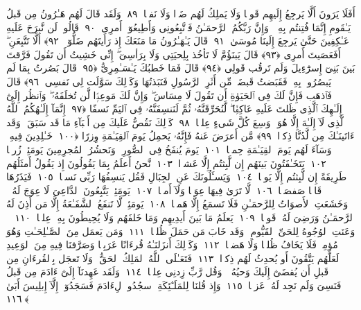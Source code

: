  أَفَلَا يَرَونَ أَلَّا يَرجِعُ إِلَيهِم قَولًۭا وَلَا يَملِكُ لَهُم ضَرًّۭا وَلَا نَفعًۭا ﴿٨٩﴾
 وَلَقَد قَالَ لَهُم هَـٰرُونُ مِن قَبلُ يَـٰقَومِ إِنَّمَا فُتِنتُم بِهِۦ ۖ وَإِنَّ رَبَّكُمُ ٱلرَّحمَـٰنُ فَٱتَّبِعُونِى وَأَطِيعُوٓا۟ أَمرِى ﴿٩٠﴾
 قَالُوا۟ لَن نَّبرَحَ عَلَيهِ عَـٰكِفِينَ حَتَّىٰ يَرجِعَ إِلَينَا مُوسَىٰ ﴿٩١﴾
 قَالَ يَـٰهَـٰرُونُ مَا مَنَعَكَ إِذ رَأَيتَهُم ضَلُّوٓا۟ ﴿٩٢﴾
 أَلَّا تَتَّبِعَنِ ۖ أَفَعَصَيتَ أَمرِى ﴿٩٣﴾
 قَالَ يَبنَؤُمَّ لَا تَأخُذ بِلِحيَتِى وَلَا بِرَأسِىٓ ۖ إِنِّى خَشِيتُ أَن تَقُولَ فَرَّقتَ بَينَ بَنِىٓ إِسرَٰٓءِيلَ وَلَم تَرقُب قَولِى ﴿٩٤﴾
 قَالَ فَمَا خَطبُكَ يَـٰسَـٰمِرِىُّ ﴿٩٥﴾
 قَالَ بَصُرتُ بِمَا لَم يَبصُرُوا۟ بِهِۦ فَقَبَضتُ قَبضَةًۭ مِّن أَثَرِ ٱلرَّسُولِ فَنَبَذتُهَا وَكَذَٟلِكَ سَوَّلَت لِى نَفسِى ﴿٩٦﴾
 قَالَ فَٱذهَب فَإِنَّ لَكَ فِى ٱلحَيَوٰةِ أَن تَقُولَ لَا مِسَاسَ ۖ وَإِنَّ لَكَ مَوعِدًۭا لَّن تُخلَفَهُۥ ۖ وَٱنظُر إِلَىٰٓ إِلَـٰهِكَ ٱلَّذِى ظَلتَ عَلَيهِ عَاكِفًۭا ۖ لَّنُحَرِّقَنَّهُۥ ثُمَّ لَنَنسِفَنَّهُۥ فِى ٱليَمِّ نَسفًا ﴿٩٧﴾
 إِنَّمَآ إِلَـٰهُكُمُ ٱللَّهُ ٱلَّذِى لَآ إِلَـٰهَ إِلَّا هُوَ ۚ وَسِعَ كُلَّ شَىءٍ عِلمًۭا ﴿٩٨﴾
 كَذَٟلِكَ نَقُصُّ عَلَيكَ مِن أَنۢبَآءِ مَا قَد سَبَقَ ۚ وَقَد ءَاتَينَـٰكَ مِن لَّدُنَّا ذِكرًۭا ﴿٩٩﴾
 مَّن أَعرَضَ عَنهُ فَإِنَّهُۥ يَحمِلُ يَومَ ٱلقِيَـٰمَةِ وِزرًا ﴿١٠٠﴾
 خَـٰلِدِينَ فِيهِ ۖ وَسَآءَ لَهُم يَومَ ٱلقِيَـٰمَةِ حِملًۭا ﴿١٠١﴾
 يَومَ يُنفَخُ فِى ٱلصُّورِ ۚ وَنَحشُرُ ٱلمُجرِمِينَ يَومَئِذٍۢ زُرقًۭا ﴿١٠٢﴾
 يَتَخَـٰفَتُونَ بَينَهُم إِن لَّبِثتُم إِلَّا عَشرًۭا ﴿١٠٣﴾
 نَّحنُ أَعلَمُ بِمَا يَقُولُونَ إِذ يَقُولُ أَمثَلُهُم طَرِيقَةً إِن لَّبِثتُم إِلَّا يَومًۭا ﴿١٠٤﴾
 وَيَسـَٔلُونَكَ عَنِ ٱلجِبَالِ فَقُل يَنسِفُهَا رَبِّى نَسفًۭا ﴿١٠٥﴾
 فَيَذَرُهَا قَاعًۭا صَفصَفًۭا ﴿١٠٦﴾
 لَّا تَرَىٰ فِيهَا عِوَجًۭا وَلَآ أَمتًۭا ﴿١٠٧﴾
 يَومَئِذٍۢ يَتَّبِعُونَ ٱلدَّاعِىَ لَا عِوَجَ لَهُۥ ۖ وَخَشَعَتِ ٱلأَصوَاتُ لِلرَّحمَـٰنِ فَلَا تَسمَعُ إِلَّا هَمسًۭا ﴿١٠٨﴾
 يَومَئِذٍۢ لَّا تَنفَعُ ٱلشَّفَـٰعَةُ إِلَّا مَن أَذِنَ لَهُ ٱلرَّحمَـٰنُ وَرَضِىَ لَهُۥ قَولًۭا ﴿١٠٩﴾
 يَعلَمُ مَا بَينَ أَيدِيهِم وَمَا خَلفَهُم وَلَا يُحِيطُونَ بِهِۦ عِلمًۭا ﴿١١٠﴾
 ۞ وَعَنَتِ ٱلوُجُوهُ لِلحَىِّ ٱلقَيُّومِ ۖ وَقَد خَابَ مَن حَمَلَ ظُلمًۭا ﴿١١١﴾
 وَمَن يَعمَل مِنَ ٱلصَّـٰلِحَـٰتِ وَهُوَ مُؤمِنٌۭ فَلَا يَخَافُ ظُلمًۭا وَلَا هَضمًۭا ﴿١١٢﴾
 وَكَذَٟلِكَ أَنزَلنَـٰهُ قُرءَانًا عَرَبِيًّۭا وَصَرَّفنَا فِيهِ مِنَ ٱلوَعِيدِ لَعَلَّهُم يَتَّقُونَ أَو يُحدِثُ لَهُم ذِكرًۭا ﴿١١٣﴾
 فَتَعَـٰلَى ٱللَّهُ ٱلمَلِكُ ٱلحَقُّ ۗ وَلَا تَعجَل بِٱلقُرءَانِ مِن قَبلِ أَن يُقضَىٰٓ إِلَيكَ وَحيُهُۥ ۖ وَقُل رَّبِّ زِدنِى عِلمًۭا ﴿١١٤﴾
 وَلَقَد عَهِدنَآ إِلَىٰٓ ءَادَمَ مِن قَبلُ فَنَسِىَ وَلَم نَجِد لَهُۥ عَزمًۭا ﴿١١٥﴾
 وَإِذ قُلنَا لِلمَلَـٰٓئِكَةِ ٱسجُدُوا۟ لِءَادَمَ فَسَجَدُوٓا۟ إِلَّآ إِبلِيسَ أَبَىٰ ﴿١١٦﴾
